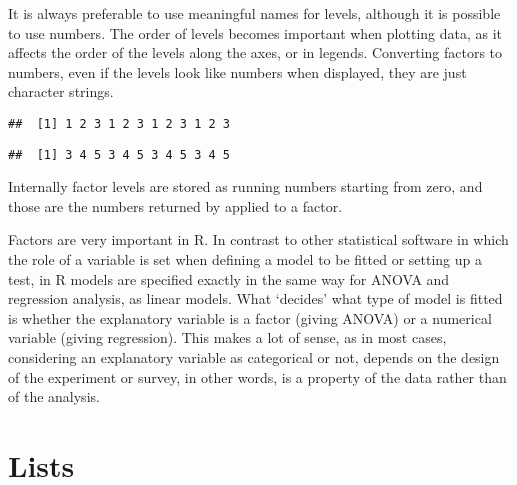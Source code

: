 \documentclass[paper=a4,10pt,div=17,headsepline,BCOR=12mm,twoside,open=right]{scrbook}\usepackage{knitr}
\begin{document}
It is always preferable to use meaningful names for levels, although it is possible to use numbers. The order of levels becomes important when plotting data, as it affects the order of the levels along the axes, or in legends. Converting factors to numbers, even if the levels look like numbers when displayed, they are just character strings.

\begin{knitrout}\footnotesize
{}\color{fgcolor}\begin{kframe}
\begin{alltt}
 \hlkwb{<-} \hlstd{(}\hlopt{:}\hlstd{,} \hlstd{)}
 \hlkwb{<-} 
\end{alltt}
\begin{verbatim}
##  [1] 1 2 3 1 2 3 1 2 3 1 2 3
\end{verbatim}
\begin{alltt}
\hlstd{(}
\end{alltt}
\begin{verbatim}
##  [1] 3 4 5 3 4 5 3 4 5 3 4 5
\end{verbatim}
\end{kframe}
\end{knitrout}

Internally factor levels are stored as running numbers starting from zero, and those are the numbers returned by  applied to a factor.

Factors are very important in R. In contrast to other statistical software in which the role of a variable is set when defining a model to be fitted or setting up a test, in R models are specified exactly in the same way for ANOVA and regression analysis, as linear models. What `decides' what type of model is fitted is whether the explanatory variable is a factor (giving ANOVA) or a numerical variable (giving regression). This makes a lot of sense, as in most cases, considering an explanatory variable as categorical or not, depends on the design of the experiment or survey, in other words, is a property of the data rather than of the analysis.

\section{Lists}
\end{document}
